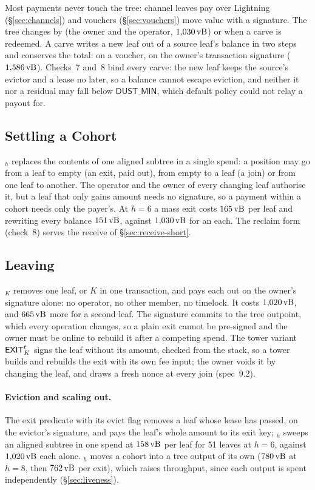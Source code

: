 Most payments never touch the tree: channel leaves pay over Lightning
(\S\ref{sec:channels}) and vouchers (\S\ref{sec:vouchers}) move value with a
signature. The tree changes by  (the owner and the operator,
$1{,}030\,\mathrm{vB}$) or when a carve is redeemed. A carve writes a new leaf out of
a source leaf's balance in two steps and conserves the total: 
on a voucher,  on the owner's transaction signature
($1{,}586\,\mathrm{vB}$). Checks~7 and~8 bind every carve: the new leaf keeps the
source's evictor and a lease no later, so a balance cannot escape eviction,
and neither it nor a residual may fall below $\mathsf{DUST\_MIN}$, which
default policy could not relay a payout for.

\predClaim

\subsection{Settling a Cohort}

$_h$ replaces the contents of one aligned subtree in a single
spend: a position may go from a leaf to empty (an exit, paid out), from
empty to a leaf (a join) or from one leaf to another. The operator and the
owner of every changing leaf authorise it, but a leaf that only gains
amount needs no signature, so a payment within a cohort needs only the
payer's. At $h = 6$ a mass exit costs $165\,\mathrm{vB}$ per leaf and rewriting every
balance $151\,\mathrm{vB}$, against $1{,}030\,\mathrm{vB}$ for an  each. The reclaim
form (check~8) serves the receive of \S\ref{sec:receive-short}.

\predRewrite

\subsection{Leaving}\label{sec:leaving}

$_K$ removes one leaf, or $K$ in one transaction, and pays each
out on the owner's signature alone: no operator, no other member, no
timelock. It costs $1{,}020\,\mathrm{vB}$, and $665\,\mathrm{vB}$ more for a second leaf. The
signature commits to the tree outpoint, which every operation changes, so
a plain exit cannot be pre-signed and the owner must be online to rebuild
it after a competing spend. The tower variant $\textsf{EXIT}^{t}_K$ signs the
leaf without its amount, checked from the stack, so a tower builds and
rebuilds the exit with its own fee input; the owner voids it by changing
the leaf, and draws a fresh nonce at every join (spec~9.2).

\predExit
\algExit

\paragraph{Eviction and scaling out.} The exit predicate with its evict
flag removes a leaf whose lease has passed, on the evictor's signature, and
pays the leaf's whole amount to its exit key; $_h$
sweeps an aligned subtree in one spend at $158\,\mathrm{vB}$ per leaf for 51 leaves
at $h = 6$, against $1{,}020\,\mathrm{vB}$ each alone. $_h$ moves a cohort
into a tree output of its own ($780\,\mathrm{vB}$ at $h = 8$, then $762\,\mathrm{vB}$ per
exit), which raises throughput, since each output is spent independently
(\S\ref{sec:liveness}).
